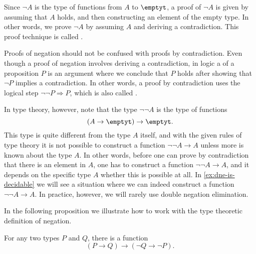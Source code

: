 \begin{rmk}
  Since $\neg A$ is the type of functions from $A$ to $\emptyt$, a proof of $\neg A$ is given by assuming that $A$ holds, and then constructing an element of the empty type. In other words, we prove $\neg A$ by assuming $A$ and deriving a contradiction. This proof technique is called .

  Proofs of negation should not be confused with proofs by contradiction. Even though a proof of negation involves deriving a contradiction, in logic a  of a proposition $P$ is an argument where we conclude that $P$ holds after showing that $\neg P$ implies a contradiction. In other words, a proof by contradiction uses the logical step $\neg\neg P \Rightarrow P$, which is also called .

  In type theory, however, note that the type $\neg\neg A$ is the type of functions
  \begin{equation*}
    (A\to\emptyt)\to\emptyt.
  \end{equation*}
  This type is quite different from the type $A$ itself, and with the given rules of type theory it is not possible to construct a function $\neg\neg A \to A$ unless more is known about the type $A$. In other words, before one can prove by contradiction that there is an element in $A$, one has to construct a function $\neg\neg A\to A$, and it depends on the specific type $A$ whether this is possible at all. In \cref{ex:dne-is-decidable} we will see a situation where we can indeed construct a function $\neg\neg A\to A$. In practice, however, we will rarely use double negation elimination.
\end{rmk}

In the following proposition we illustrate how to work with the type theoretic definition of negation.

\begin{prp}\label{prp:contravariant-neg}
  For any two types $P$ and $Q$, there is a function
  \begin{equation*}
    (P\to Q)\to (\neg Q \to \neg P).
  \end{equation*}
\end{prp}

